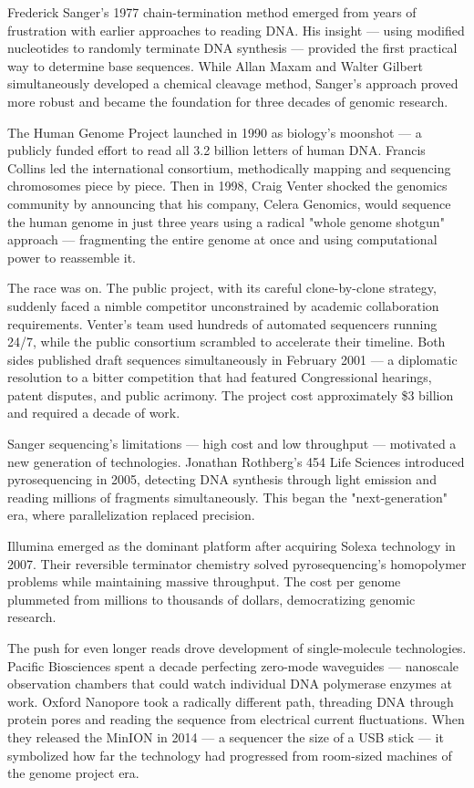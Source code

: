 \begin{historical}
Frederick Sanger's 1977 chain-termination method emerged from years of frustration with earlier approaches to reading DNA. His insight — using modified nucleotides to randomly terminate DNA synthesis — provided the first practical way to determine base sequences. While Allan Maxam and Walter Gilbert simultaneously developed a chemical cleavage method, Sanger's approach proved more robust and became the foundation for three decades of genomic research.

The Human Genome Project launched in 1990 as biology's moonshot — a publicly funded effort to read all 3.2 billion letters of human DNA. Francis Collins led the international consortium, methodically mapping and sequencing chromosomes piece by piece. Then in 1998, Craig Venter shocked the genomics community by announcing that his company, Celera Genomics, would sequence the human genome in just three years using a radical "whole genome shotgun" approach — fragmenting the entire genome at once and using computational power to reassemble it.

The race was on. The public project, with its careful clone-by-clone strategy, suddenly faced a nimble competitor unconstrained by academic collaboration requirements. Venter's team used hundreds of automated sequencers running 24/7, while the public consortium scrambled to accelerate their timeline. Both sides published draft sequences simultaneously in February 2001 — a diplomatic resolution to a bitter competition that had featured Congressional hearings, patent disputes, and public acrimony. The project cost approximately \$3 billion and required a decade of work.

Sanger sequencing's limitations — high cost and low throughput — motivated a new generation of technologies. Jonathan Rothberg's 454 Life Sciences introduced pyrosequencing in 2005, detecting DNA synthesis through light emission and reading millions of fragments simultaneously. This began the "next-generation" era, where parallelization replaced precision.

Illumina emerged as the dominant platform after acquiring Solexa technology in 2007. Their reversible terminator chemistry solved pyrosequencing's homopolymer problems while maintaining massive throughput. The cost per genome plummeted from millions to thousands of dollars, democratizing genomic research.

The push for even longer reads drove development of single-molecule technologies. Pacific Biosciences spent a decade perfecting zero-mode waveguides — nanoscale observation chambers that could watch individual DNA polymerase enzymes at work. Oxford Nanopore took a radically different path, threading DNA through protein pores and reading the sequence from electrical current fluctuations. When they released the MinION in 2014 — a sequencer the size of a USB stick — it symbolized how far the technology had progressed from room-sized machines of the genome project era.


\end{historical}
